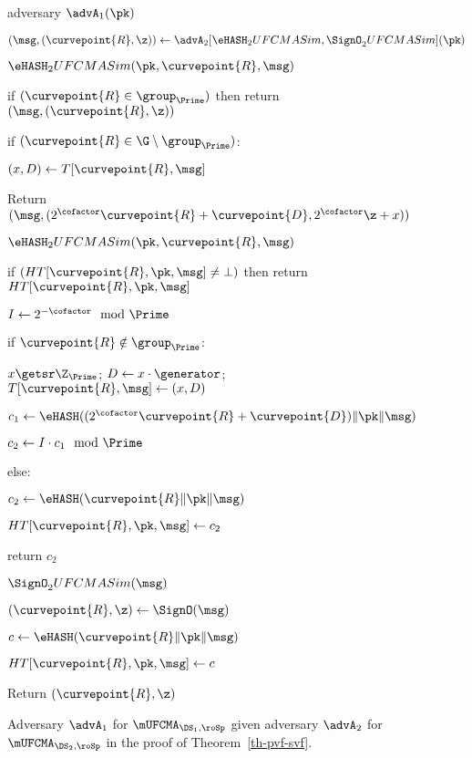 \begin{figure}
	{	
		\begin{algorithm-initial}{adversary $\advA_1(\pk)$}
			\item $(\msg, (\curvepoint{R}, \z)) \gets \advA_2[\eHASH_2UFCMASim, \SignO_2 UFCMASim](\pk)$
			\item $\eHASH_2UFCMASim(\pk, \curvepoint{R},  \msg)$
			\item if $(\curvepoint{R} \in \group_{\Prime})$ then return $(\msg, (\curvepoint{R}, \z))$
			\item if $(\curvepoint{R} \in \G \setminus \group_{\Prime})$:
			\item \quad $(x, D) \gets T[\curvepoint{R}, \msg]$
			\item Return $( \msg, (2^\cofactor\curvepoint{R} + \curvepoint{D}, 2^\cofactor\z + x))$
		\end{algorithm-initial}  \vspace{2pt}
		\begin{algorithm-subsequent}{$\eHASH_2UFCMASim(\pk, \curvepoint{R},  \msg)$}
			\item if $(HT[\curvepoint{R}, \pk, \msg] \neq \bot)$ then return $HT[\curvepoint{R}, \pk, \msg]$
			\item $I \gets 2^{-\cofactor} \mod \Prime$
			\item if $\curvepoint{R} \notin \group_{\Prime}$:
			\item \quad $x \getsr \Z_{\Prime}$; $D \gets x \cdot \generator$; $T[\curvepoint{R}, \msg] \gets (x, D)$
			\item \quad $c_1 \gets \eHASH((2^\cofactor\curvepoint{R} + \curvepoint{D}) \|\pk\| \msg)$
			\item \quad $c_2 \gets I \cdot c_1 \mod \Prime$
			\item else:
			\item \quad $c_2 \gets \eHASH(\curvepoint{R}\|\pk\| \msg)$
			\item $HT[\curvepoint{R}, \pk, \msg] \gets c_2$
			\item return $c_2$
		\end{algorithm-subsequent}  
		\begin{algorithm-subsequent}{$\SignO_2 UFCMASim(\msg)$}
			\item $(\curvepoint{R}, \z) \gets \SignO(\msg)$
			\item $c \gets \eHASH(\curvepoint{R}\|\pk\| \msg)$
			\item $HT[\curvepoint{R}, \pk, \msg] \gets c$
			\item Return $(\curvepoint{R}, \z)$
		\end{algorithm-subsequent} 
	}
	\vspace{-5pt}
	\caption{Adversary $\advA_1$ for $\mUFCMA_{\DS_1,\roSp}$ given adversary $\advA_2$ for $\mUFCMA_{\DS_2,\roSp}$ in the proof of Theorem~\ref{th-pvf-svf}.}
	\label{fig:A1}
	\hrulefill
	\vspace{-10pt}
\end{figure}
